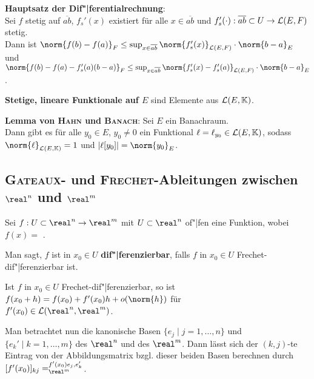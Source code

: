\textbf{Hauptsatz der Dif"|ferentialrechnung}: \\
Sei $f$ stetig auf $\overline{ab}$,
$f_s'(x)$ existiert für alle $x \in \overline{ab}$ und
$f_s'(\cdot): \overline{ab} \subset U \rightarrow \mathcal{L}(E,F)$ stetig. \\
Dann ist
$\norm{f(b) - f(a)}_F \le \sup_{x \in \overline{ab}}
\norm{f_s'(x)}_{\L(E,F)} \cdot \norm{b - a}_E$ und \\
$\norm{f(b) - f(a) - f_s'(a)(b - a)}_F \le \sup_{x \in \overline{ab}}
\norm{f_s'(x) - f_s'(a)}_{\L(E,F)} \cdot \norm{b - a}_E$.

\linie

\textbf{Stetige, lineare Funktionale auf $E$} sind Elemente aus
$\mathcal{L}(E, \mathbb{K})$.

\textbf{Lemma von \textsc{Hahn} und \textsc{Banach}}:
Sei $E$ ein Banachraum. \\
Dann gibt es für alle $y_0 \in E$, $y_0 \not= 0$
ein Funktional $\ell = \ell_{y_0} \in \mathcal{L}(E, \mathbb{K})$, sodass \\
$\norm{\ell}_{\L(E, \field)} = 1$ und
$|\ell[y_0]| = \norm{y_0}_E$.

\pagebreak

\subsection{%
    \textsc{Gateaux}- und \textsc{Frechet}-Ableitungen zwischen
    \texorpdfstring{$\real^n$ und $\real^m$}{ℝ\^{}n und ℝ\^{}m}
}

Sei $f: U \subset \real^n \rightarrow \real^m$ mit $U \subset \real^n$ of"|fen
eine Funktion, wobei $f(x) =$
.

Man sagt, $f$ ist in $x_0 \in U$ \textbf{dif"|ferenzierbar},
falls $f$ in $x_0 \in U$ Frechet-dif"|ferenzierbar ist.

\linie

Ist $f$ in $x_0 \in U$ Frechet-dif"|ferenzierbar, so ist
$f(x_0 + h) = f(x_0) + f'(x_0)h + o(\norm{h})$ für \\
$f'(x_0) \in \L(\real^n, \real^m)$.

Man betrachtet nun die kanonische Basen $\{e_j \;|\; j = 1, \dotsc, n\}$ und
$\{e_k' \;|\; k = 1, \dotsc, m\}$ des $\real^n$ und des $\real^m$.
Dann lässt sich der $(k, j)$-te Eintrag von der Abbildungsmatrix bzgl. dieser
beiden Basen berechnen durch
$[f'(x_0)]_{kj} = \sp{f'(x_0)e_j, e_k'}_{\real^m}$.

